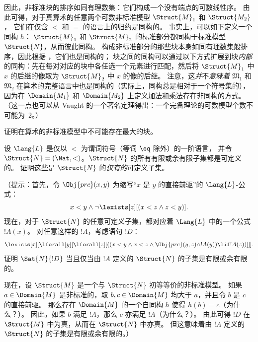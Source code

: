\documentclass[../../../include/open-logic-section]{subfiles}
\begin{document}
因此，非标准块的排序如同有理数集：它们构成一个没有端点的可数线性序。
由此可得，对于真算术的任意两个可数非标准模型 $\Struct{M}_1$ 和 $\Struct{M_2}$，
它们在仅含 $<$ 和 $=$ 的语言上的归约是同构的。
事实上，可以如下定义一个同构 $h$：
$\Struct{M}_1$ 和 $\Struct{M}_2$ 的标准部分都同构于标准模型 $\Struct{N}$，从而彼此同构。
构成非标准部分的那些块本身如同有理数集般排序，因此根据 ，它们也是同构的；
块之间的同构可以通过以下方式扩展到块\emph{内部}的同构：先在每对对应的块中各任选一个元素进行匹配，然后将 $\Struct{M}_1$ 中 $x$ 的后继的像取为 $\Struct{M}_2$ 中 $x$ 的像的后继。
注意，这\emph{并}不\emph{意味着} $\mathfrak{M}_1$ 和 $\mathfrak{M}_2$ 在算术的完整语言中也是同构的（实际上，同构总是相对于一个符号集的），因为在 $\Domain{M_1}$ 和 $\Domain{M_2}$ 上定义加法和乘法存在非同构的方式。（这一点也可以从 Vaught 的一个著名定理得出：一个完备理论的可数模型个数不可能为~2。）

\begin{prob}
证明在算术的非标准模型中不可能存在最大的块。
\end{prob}

\begin{prob}
设 $\Lang{L}$ 是仅以 $<$ 为谓词符号（等词 $\eq$ 除外）的一阶语言，
并令 $\Struct{N} = (\Nat, <)$。$\Struct{N}$ 的所有有限或余有限子集都是可定义的。
证明这些是 $\Struct{N}$ 的\emph{仅有的}可定义子集。

（提示：首先，令 $\Obj{prc}(x,y)$ 为缩写“$x$ 是 $y$ 的直接前驱”的 $\Lang{L}$-公式：
\[
x<y \land \lnot \lexists[z][(x<z \land z < y)].
\]
现在，对于 $\Struct{N}$ 的任意可定义子集，都对应着 $\Lang{L}$ 中的一个公式 $!A(x)$。
对任意这样的 $!A$，考虑语句 $!D$：
\[
\lexists[x][\lforall[y][\lforall[z][((x<y \land x<z \land \Obj{prc}(y,z)
  \land !A(y)) \lif !A(z))]]].
\]
证明 $\Sat{N}{!D}$ 当且仅当由 $!A$ 定义的 $\Struct{N}$ 的子集是有限或余有限的。

现在，设 $\Struct{M}$ 是一个与 $\Struct{N}$ 初等等价的非标准模型。
如果 $a \in \Domain{M}$ 是非标准的，取 $b, c \in \Domain{M}$ 均大于 $a$，并且令 $b$ 是 $c$ 的直接前驱。
那么存在 $\Domain{M}$ 的一个自同构 $h$ 使得 $h(b)=c$（为什么？）。
因此，如果 $b$ 满足 $!A$，那么 $c$ 亦满足 $!A$（为什么？）。
由此可得 $!D$ 在 $\Struct{M}$ 中为真，从而在 $\Struct{N}$ 中亦真。
但这意味着由 $!A$ 定义的 $\Struct{N}$ 的子集是有限或余有限的。）
\end{prob}
\end{document}
